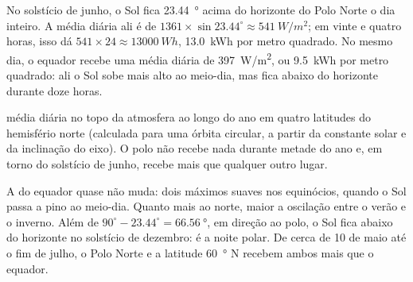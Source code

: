 \begin{example}\label{ex:g10:earth-energy-budget:pole}
No solstício de junho, o Sol fica \qty{23.44}{\degree} acima do horizonte
do Polo Norte o dia inteiro. A  média diária ali é de $1361
\times \sin 23.44^\circ \approx \qty{541}{W/m^2}$; em vinte e quatro horas,
isso dá $541 \times 24 \approx \qty{13000}{Wh}$, \qty{13.0}{kWh} por metro
quadrado. No mesmo dia, o equador recebe uma média diária de
\qty{397}{W/m^2}, ou \qty{9.5}{kWh} por metro quadrado: ali o Sol sobe mais
alto ao meio-dia, mas fica abaixo do horizonte durante doze horas.
\end{example}

\begin{omfigure}

{\small {} média diária no topo da atmosfera ao longo do ano em
quatro latitudes do hemisfério norte (calculada para uma órbita circular, a
partir da constante solar e da inclinação do eixo). O polo não recebe nada
durante metade do ano e, em torno do solstício de junho, recebe mais que
qualquer outro lugar.}
\end{omfigure}

\begin{remark}\label{rem:g10:earth-energy-budget:curves}
A  do equador quase não muda: dois máximos suaves nos equinócios,
quando o Sol passa a pino ao meio-dia. Quanto mais ao norte, maior a
oscilação entre o verão e o inverno. Além de
$90^\circ - 23.44^\circ = \qty{66.56}{\degree}$, em direção ao polo, o Sol
fica abaixo do horizonte no solstício de dezembro: é a noite polar. De
cerca de 10 de maio até o fim de julho, o Polo Norte e a latitude
\qty{60}{\degree} N recebem ambos mais que o equador.
\end{remark}

